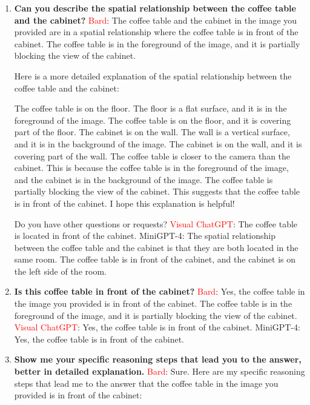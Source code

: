 \begin{enumerate}
    \item \textbf{Can you describe the spatial relationship between the coffee table and the cabinet?}
    \subitem \textcolor{Red}{Bard}: 
    The coffee table and the cabinet in the image you provided are in a spatial relationship where the coffee table is in front of the cabinet. The coffee table is in the foreground of the image, and it is partially blocking the view of the cabinet.

    Here is a more detailed explanation of the spatial relationship between the coffee table and the cabinet:

    The coffee table is on the floor. The floor is a flat surface, and it is in the foreground of the image. The coffee table is on the floor, and it is covering part of the floor.
    The cabinet is on the wall. The wall is a vertical surface, and it is in the background of the image. The cabinet is on the wall, and it is covering part of the wall.
    The coffee table is closer to the camera than the cabinet. This is because the coffee table is in the foreground of the image, and the cabinet is in the background of the image.
    The coffee table is partially blocking the view of the cabinet. This suggests that the coffee table is in front of the cabinet.
    I hope this explanation is helpful!

    Do you have other questions or requests?
    \subitem \textcolor{red}{Visual ChatGPT}: The coffee table is located in front of the cabinet.
    \subitem MiniGPT-4: The spatial relationship between the coffee table and the cabinet is that they are both located in the same room. The coffee table is in front of the cabinet, and the cabinet is on the left side of the room.
    \item \textbf{Is this coffee table in front of the cabinet?}
    \subitem \textcolor{Red}{Bard}: 
    Yes, the coffee table in the image you provided is in front of the cabinet. The coffee table is in the foreground of the image, and it is partially blocking the view of the cabinet.
    \subitem \textcolor{red}{Visual ChatGPT}: Yes, the coffee table is in front of the cabinet.
    \subitem MiniGPT-4: Yes, the coffee table is in front of the cabinet.
    \item \textbf{Show me your specific reasoning steps that lead you to the answer, better in detailed explanation.}
    \subitem \textcolor{Red}{Bard}: Sure. Here are my specific reasoning steps that lead me to the answer that the coffee table in the image you provided is in front of the cabinet:


\end{enumerate}

